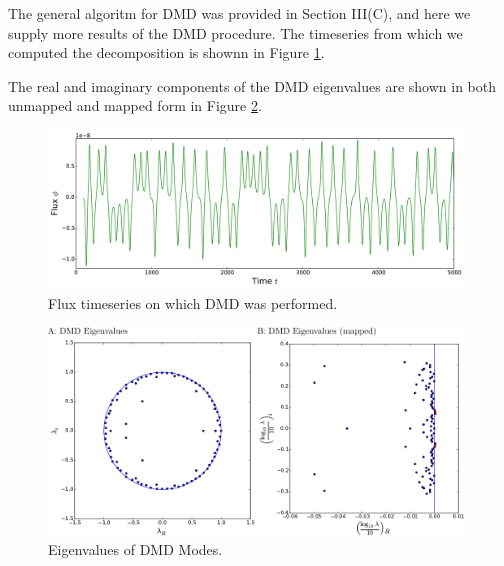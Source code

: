 The general algoritm for DMD was provided in Section III(C), and here we supply more results of the DMD procedure.
The timeseries from which we computed the decomposition is shownn in Figure \ref{fig:DMD-timeseries}.

The real and imaginary components of the DMD eigenvalues are shown in both unmapped and mapped form in Figure \ref{fig:DMD-eigenvalues}.

\begin{figure}
  \centering
  \includegraphics[width=0.98\textwidth]{../figures/DMD/DMD-data-timeseries-longer-wide.pdf}
  \caption[]{
    Flux timeseries on which DMD was performed.    
  }
  \label{fig:DMD-timeseries}  
\end{figure}

\begin{figure}
  \centering
  \includegraphics[width=0.98\textwidth]{../figures/DMD/eigenvalues-both-labeled.pdf}
  \caption[]{
    Eigenvalues of DMD Modes.
  }
  \label{fig:DMD-eigenvalues}  
\end{figure}


